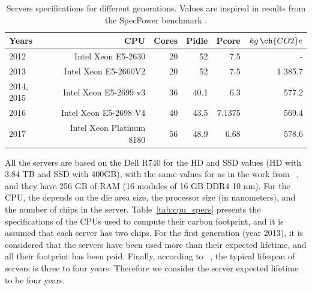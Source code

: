 \begin{table}[h]
  \small
  \caption{Servers specifications for different generations. Values are inspired in results from the SpecPower benchmark \cite{spec_2014,spec_2017,spec_2016,spec_2013}.} \centering
  \label{tab:servers_specs} 
  \begin{tabular}{|l|r|r|r|r|r|}
  \hline    
  \textbf{Years} & \textbf{CPU} &   \textbf{Cores} & \textbf{Pidle}  & \textbf{Pcore}  & \textbf{$kg\,\ch{CO2}e$}  \\
  \hline
   2012     & Intel Xeon E5-2630 & 20 & 52 & 7.5  & -            \\
  \hline
   2013    & Intel Xeon E5-2660V2 & 20 & 52 & 7.5  & 1 385.7     \\
  \hline
   2014, 2015 & Intel Xeon E5-2699 v3 & 36 & 40.1 & 6.3  & 577.2  \\
  \hline
  2016   & Intel Xeon E5-2698 V4 &  40 & 43.5 & 7.1375  & 569.4  \\
  \hline
  2017  & Intel Xeon Platinum 8180 & 56 & 48.9 & 6.68  & 578.6   \\
  \hline  
\end{tabular}  
\end{table}




All the servers are based on the Dell R740 for the HD and SSD values (HD with 3.84 TB and SSD with 400GB), with the same values for  as in the work from ~\citep{gupta2022_ACT}, and they have 256 GB of RAM (16 modules of 16 GB DDR4 10 nm). For the CPU, the  depends on the die area size, the processor size (in nanometers), and the number of chips in the server. Table~\ref{tab:cpu_specs} presents the specifications of the CPUs used to compute their carbon footprint, and it is assumed that each server has two chips. For the first generation (year 2013), it is considered that the servers have been used more than their expected lifetime, and all their  footprint has been paid. Finally, according to ~\citet{datacenter_as_computer}, the typical lifespan of servers is three to four years. Therefore we consider the server expected lifetime to be four years.


